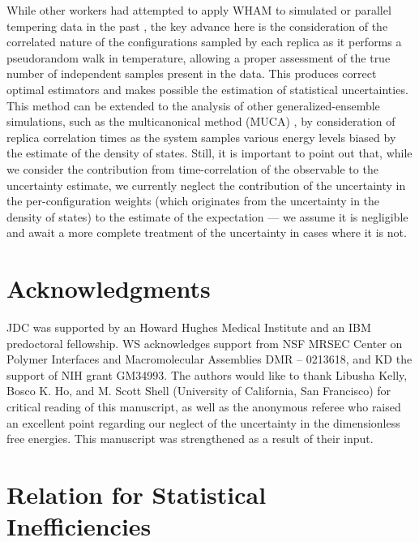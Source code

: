 While other workers had attempted to apply WHAM to simulated or parallel tempering data in the past \cite{mitsutake:2000a,sugita:1999a}, the key advance here is the consideration of the correlated nature of the configurations sampled by each replica as it performs a pseudorandom walk in temperature, allowing a proper assessment of the true number of independent samples present in the data.  This produces correct optimal estimators and makes possible the estimation of statistical uncertainties.  This method can be extended to the analysis of other generalized-ensemble simulations, such as the multicanonical method (MUCA) \cite{berg:1991a,berg:1992a,hansmann:1993a,nakajima:1997a,yasar:2000a}, by consideration of replica correlation times as the system samples various energy levels biased by the estimate of the density of states.  Still, it is important to point out that, while we consider the contribution from time-correlation of the observable to the uncertainty estimate, we currently neglect the contribution of the uncertainty in the per-configuration weights (which originates from the uncertainty in the density of states) to the estimate of the expectation --- we assume it is negligible and await a more complete treatment of the uncertainty in cases where it is not.  


\section{Acknowledgments}

JDC was supported by an Howard Hughes Medical Institute and an IBM predoctoral fellowship.  WS acknowledges support from NSF MRSEC Center on Polymer Interfaces and Macromolecular Assemblies DMR -- 0213618, and KD the support of NIH grant GM34993.  The authors would like to thank Libusha Kelly, Bosco K. Ho, and M. Scott Shell (University of California, San Francisco) for critical reading of this manuscript, as well as the anonymous referee who raised an excellent point regarding our neglect of the uncertainty in the dimensionless free energies.  This manuscript was strengthened as a result of their input.



\section{Relation for Statistical Inefficiencies}
\label{wham:appendix:statistical-inefficiency-relation}

